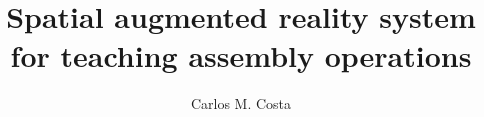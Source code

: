 









\title{\LARGE \bf
Spatial augmented reality system for teaching assembly operations
}

\author{Carlos M. Costa}

\maketitle









%









